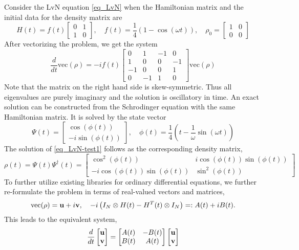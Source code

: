 \documentclass[11pt]{article}
\begin{document}
Consider the LvN equation \eqref{eq_LvN} when the  Hamiltonian matrix and the initial data for the density matrix are
\[
H(t) = f(t)\begin{bmatrix} 0 & 1 \\ 1 & 0 \end{bmatrix},\quad
%
f(t) = \frac{1}{4}\left( 1 - \cos(\omega t) \right),\quad
%
\rho_0 = \begin{bmatrix} 1 & 0 \\ 0 & 0 \end{bmatrix}
\]
After vectorizing the problem, we get the system
\begin{equation}\label{eq_LvN-test1}
\frac{d}{dt}\mbox{vec$(\rho)$} = -i f(t)\begin{bmatrix}
  0 & 1 & -1 & 0 \\
  1 & 0 & 0 & -1 \\
 -1 & 0 & 0 &  1 \\
  0 & -1 & 1 & 0 
  \end{bmatrix}\mbox{vec$(\rho)$}
\end{equation}
Note that the matrix on the right hand side is skew-symmetric. Thus all eigenvalues are purely
imaginary and the solution is oscillatory in time. An exact solution can be constructed from the
Schrodinger equation with the same Hamiltonian matrix. It is solved by the state vector
\[
\Psi(t) = \begin{bmatrix}
\cos(\phi(t)) \\ -i \sin(\phi(t))
  \end{bmatrix},\quad \phi(t) = \frac{1}{4}\left( t - \frac{1}{\omega}\sin(\omega t) \right)
\]
The solution of \eqref{eq_LvN-test1} follows as the corresponding density matrix,
\[
\rho(t) = \Psi(t) \Psi^\dag(t) = \begin{bmatrix}
  \cos^2(\phi(t)) & i \cos(\phi(t)) \sin(\phi(t)) \\
  -i \cos(\phi(t)) \sin(\phi(t)) & \sin^2(\phi(t))
  \end{bmatrix}
\]
To further utilize existing libraries for ordinary differential equations, we further re-formulate
the problem in terms of real-valued vectors and matrices,
\[
\mbox{vec$(\rho)$} = {\mathbf u} + i {\mathbf v}, \quad  -i\left( I_N\otimes H(t) - H^T(t) \otimes I_N \right) =:
A(t) + i B(t).
\]
This leads to the equivalent system,
\[
\frac{d}{dt}\begin{bmatrix} \ub \\ \vb \end{bmatrix} =
%
\begin{bmatrix}
  A(t) & -B(t) \\ B(t) & A(t)
\end{bmatrix}
\begin{bmatrix} \ub \\ \vb \end{bmatrix}
\]
\end{document}
